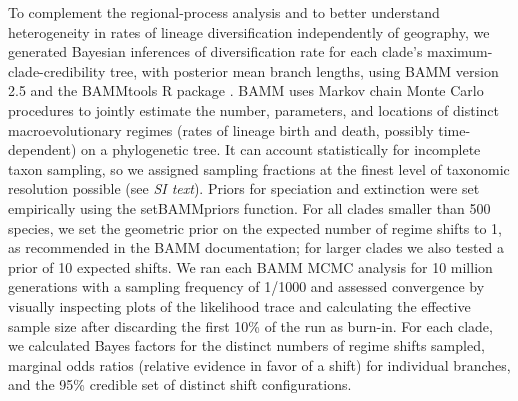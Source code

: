 To complement the regional-process analysis and to better understand
heterogeneity in rates of lineage diversification independently of
geography, we generated Bayesian inferences of diversification rate
for each clade's maximum-clade-credibility tree, with posterior mean
branch lengths, using BAMM version 2.5 and the BAMMtools R package
\citep{Rabosky2014}. BAMM uses Markov chain Monte Carlo procedures to
jointly estimate the number, parameters, and locations of distinct
macroevolutionary regimes (rates of lineage birth and death, possibly
time-dependent) on a phylogenetic tree. It can account statistically
for incomplete taxon sampling, so we assigned sampling fractions at
the finest level of taxonomic resolution possible (see \textit{SI
  text}). Priors for speciation and extinction were set empirically
using the \textrm{setBAMMpriors} function. For all clades smaller than
500 species, we set the geometric prior on the expected number of
regime shifts to 1, as recommended in the BAMM documentation; for
larger clades we also tested a prior of 10 expected shifts. We ran
each BAMM MCMC analysis for 10 million generations with a sampling
frequency of 1/1000 and assessed convergence by visually inspecting
plots of the likelihood trace and calculating the effective sample
size after discarding the first 10\% of the run as burn-in. For each
clade, we calculated Bayes factors for the distinct numbers of regime
shifts sampled, marginal odds ratios (relative evidence in favor of a
shift) for individual branches, and the 95\% credible set of distinct
shift configurations.

